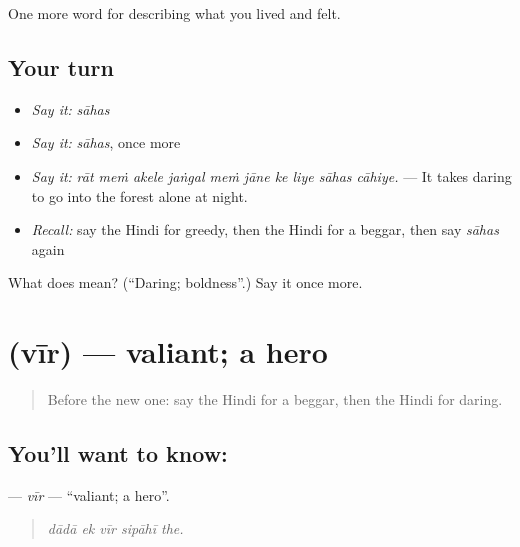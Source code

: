 \begin{grammarlens}[title={What you've built}]
One more word for describing what you lived and felt.
\end{grammarlens}

\subsection*{Your turn}
\begin{itemize}
\raggedright
  \item \emph{Say it:} \emph{sāhas}
  \item \emph{Say it:} \emph{sāhas}, once more
  \item \emph{Say it:} \emph{rāt meṁ akele jaṅgal meṁ jāne ke liye sāhas cāhiye.} — It takes daring to go into the forest alone at night.
  \item \emph{Recall:} say the Hindi for greedy, then the Hindi for a beggar, then say \emph{sāhas} again
\end{itemize}

\begin{tcolorbox}[breakable,colback=teal!4,colframe=teal!35!black,title={Before you move on}]
What does  mean? (\textquotedblleft{}Daring; boldness\textquotedblright{}.) Say it once more.
\end{tcolorbox}
\section[\texorpdfstring{\hi{वीर} (vīr)}{वीर (vīr)}]{ (vīr) — valiant; a hero}

\label{lesson:HI-C470-vir}



\begin{quote}
Before the new one: say the Hindi for a beggar, then the Hindi for daring.
\end{quote}

\subsection*{You'll want to know: }
\textbf{} — \emph{vīr} — \textquotedblleft{}valiant; a hero\textquotedblright{}.

\begin{quote}
    
\end{quote}

\begin{quote}
\emph{dādā ek vīr sipāhī the.}
\end{quote}

